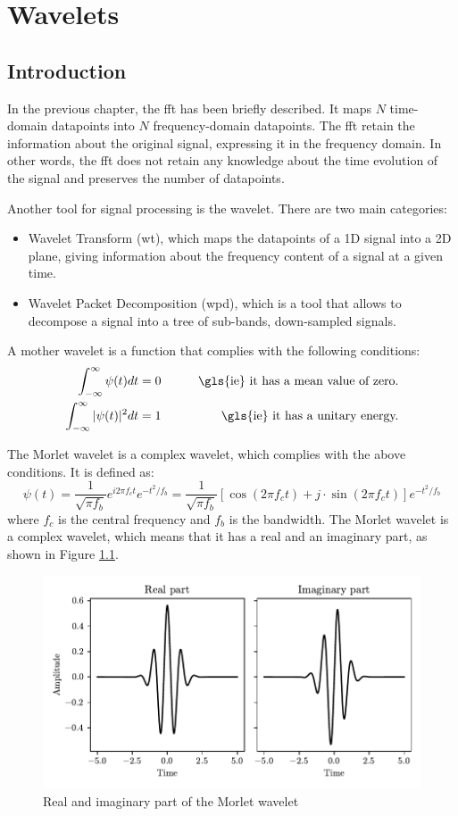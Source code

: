 \chapter{Wavelets}
\label{app:wavelet}

\section{Introduction}
In the previous chapter, the \gls{fft} has been briefly described. It maps $N$ time-domain datapoints into $N$ frequency-domain datapoints. The \gls{fft} retain the information about the original signal, expressing it in the frequency domain. In other words, the \gls{fft} does not retain any knowledge about the time evolution of the signal and preserves the number of datapoints.

Another tool for signal processing is the wavelet. There are two main categories:
\begin{itemize}
\item  Wavelet Transform (\gls{wt}), which maps the datapoints of a 1D signal into a 2D plane, giving information about the frequency content of a signal at a given time.
\item Wavelet Packet Decomposition (\gls{wpd}), which is a tool that allows to decompose a signal into a tree of sub-bands, down-sampled signals. 
\end{itemize}

A mother wavelet is a function that complies with the following conditions:
\begin{align}
\int_{-\infty}^{\infty} \psi(t) dt = 0 & \qquad &\text{\gls{ie} it has a mean value of zero.} \\
\int_{-\infty}^{\infty} |\psi(t)|^2 dt = 1 & \qquad &\text{\gls{ie} it has a unitary energy.}
\end{align}

The Morlet wavelet is a complex wavelet, which complies with the above conditions. It is defined as:
\begin{equation}
\psi(t) = \frac{1}{\sqrt{\pi f_b}} e^{i 2 \pi f_c t} e^{-t^2/f_b} =  \frac{1}{\sqrt{\pi f_b}}[ \cos(2 \pi f_c t) + j\cdot \sin(2 \pi f_c t)] e^{-t^2/f_b}
\end{equation}
where $f_c$ is the central frequency and $f_b$ is the bandwidth. The Morlet wavelet is a complex wavelet, which means that it has a real and an imaginary part, as shown in Figure \ref{fig:morlet}. 

\begin{figure}
\centering
\includegraphics[]{images/morlet.pdf}
\caption{Real and imaginary part of the Morlet wavelet}
\label{fig:morlet}
\end{figure}
